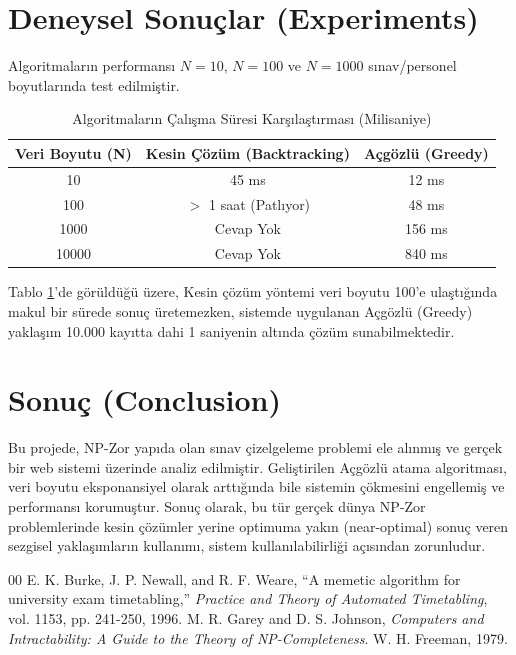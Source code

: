\documentclass[conference]{IEEEtran}
\begin{document}
\section{Deneysel Sonuçlar (Experiments)}
Algoritmaların performansı $N=10$, $N=100$ ve $N=1000$ sınav/personel boyutlarında test edilmiştir.

\begin{table}[htbp]
\caption{Algoritmaların Çalışma Süresi Karşılaştırması (Milisaniye)}
\begin{center}
\begin{tabular}{|c|c|c|}
\hline
\textbf{Veri Boyutu (N)} & \textbf{Kesin Çözüm (Backtracking)} & \textbf{Açgözlü (Greedy)} \\
\hline
10 & 45 ms & 12 ms \\
\hline
100 & $>$ 1 saat (Patlıyor) & 48 ms \\
\hline
1000 & Cevap Yok & 156 ms \\
\hline
10000 & Cevap Yok & 840 ms \\
\hline
\end{tabular}
\label{tab1}
\end{center}
\end{table}

Tablo \ref{tab1}'de görüldüğü üzere, Kesin çözüm yöntemi veri boyutu 100'e ulaştığında makul bir sürede sonuç üretemezken, sistemde uygulanan Açgözlü (Greedy) yaklaşım 10.000 kayıtta dahi 1 saniyenin altında çözüm sunabilmektedir.

\section{Sonuç (Conclusion)}
Bu projede, NP-Zor yapıda olan sınav çizelgeleme problemi ele alınmış ve gerçek bir web sistemi üzerinde analiz edilmiştir. Geliştirilen Açgözlü atama algoritması, veri boyutu eksponansiyel olarak arttığında bile sistemin çökmesini engellemiş ve performansı korumuştur. Sonuç olarak, bu tür gerçek dünya NP-Zor problemlerinde kesin çözümler yerine optimuma yakın (near-optimal) sonuç veren sezgisel yaklaşımların kullanımı, sistem kullanılabilirliği açısından zorunludur.

\begin{thebibliography}{00}
 E. K. Burke, J. P. Newall, and R. F. Weare, ``A memetic algorithm for university exam timetabling,'' \textit{Practice and Theory of Automated Timetabling}, vol. 1153, pp. 241-250, 1996.
 M. R. Garey and D. S. Johnson, \textit{Computers and Intractability: A Guide to the Theory of NP-Completeness}. W. H. Freeman, 1979.
\end{thebibliography}
\end{document}
